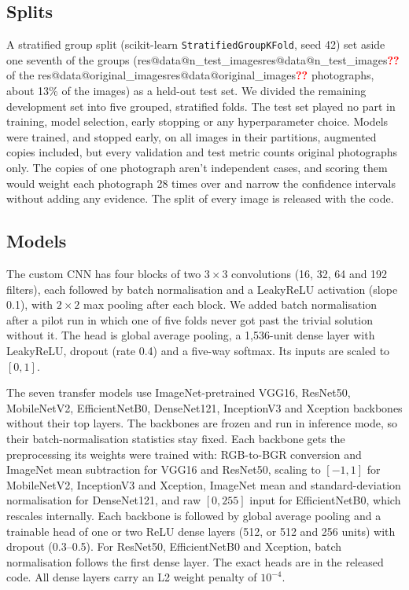 \documentclass[11pt]{article}
\makeatletter
\newcommand{\res}[2]{\ifcsname res@#1@#2\endcsname\csname res@#1@#2\endcsname\else\textcolor{red}{\textbf{??}}\fi}
\makeatother
\begin{document}
\subsection*{Splits}
A stratified group split (scikit-learn \texttt{StratifiedGroupKFold}, seed 42) set aside one seventh of the groups (\res{data}{n_test_images} of the \res{data}{original_images} photographs, about 13\% of the images) as a held-out test set. We divided the remaining development set into five grouped, stratified folds. The test set played no part in training, model selection, early stopping or any hyperparameter choice. Models were trained, and stopped early, on all images in their partitions, augmented copies included, but every validation and test metric counts original photographs only. The copies of one photograph aren't independent cases, and scoring them would weight each photograph 28 times over and narrow the confidence intervals without adding any evidence. The split of every image is released with the code.

\subsection*{Models}
The custom CNN has four blocks of two $3\times3$ convolutions (16, 32, 64 and 192 filters), each followed by batch normalisation\cite{ioffe2015batchnorm} and a LeakyReLU activation (slope 0.1), with $2\times2$ max pooling after each block. We added batch normalisation after a pilot run in which one of five folds never got past the trivial solution without it. The head is global average pooling, a 1{,}536-unit dense layer with LeakyReLU, dropout (rate 0.4) and a five-way softmax. Its inputs are scaled to $[0,1]$.

The seven transfer models use ImageNet-pretrained\cite{deng2009imagenet} VGG16\cite{simonyan2015vgg}, ResNet50\cite{he2016resnet}, MobileNetV2\cite{sandler2018mobilenetv2}, EfficientNetB0\cite{tan2019efficientnet}, DenseNet121\cite{huang2017densenet}, InceptionV3\cite{szegedy2016inception} and Xception\cite{chollet2017xception} backbones without their top layers. The backbones are frozen and run in inference mode, so their batch-normalisation statistics stay fixed\cite{tajbakhsh2016}. Each backbone gets the preprocessing its weights were trained with: RGB-to-BGR conversion and ImageNet mean subtraction for VGG16 and ResNet50, scaling to $[-1,1]$ for MobileNetV2, InceptionV3 and Xception, ImageNet mean and standard-deviation normalisation for DenseNet121, and raw $[0,255]$ input for EfficientNetB0, which rescales internally. Each backbone is followed by global average pooling and a trainable head of one or two ReLU dense layers (512, or 512 and 256 units) with dropout (0.3--0.5). For ResNet50, EfficientNetB0 and Xception, batch normalisation follows the first dense layer. The exact heads are in the released code. All dense layers carry an L2 weight penalty of $10^{-4}$.
\end{document}
